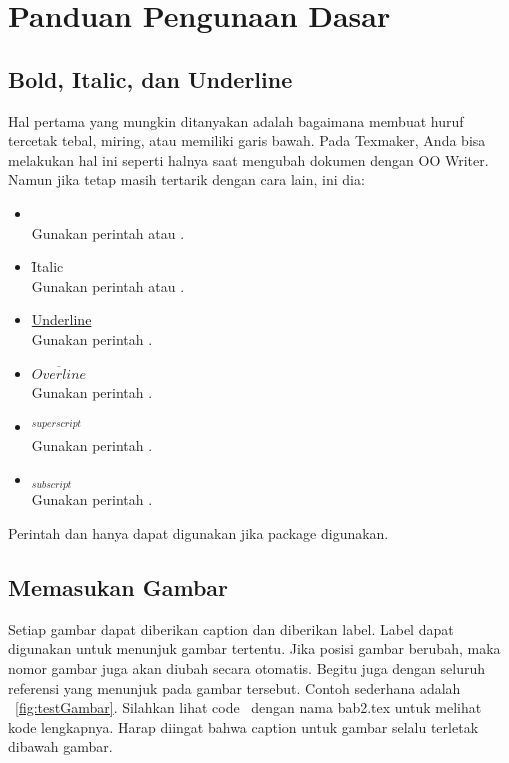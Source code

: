 \section{Panduan Pengunaan Dasar \latex}
\label{sec:latexUsage}

\subsection{Bold, Italic, dan Underline}
\label{sec:latexBIU}
Hal pertama yang mungkin ditanyakan adalah bagaimana membuat huruf tercetak tebal, miring, atau memiliki garis bawah.
Pada Texmaker, Anda bisa melakukan hal ini seperti halnya saat mengubah dokumen dengan OO Writer.
Namun jika tetap masih tertarik dengan cara lain, ini dia:

\begin{itemize}
	\item {} \\
	      Gunakan perintah  atau
	      .
	\item \f{Italic} \\
	      Gunakan perintah  atau
	      .
	\item \underline{Underline} \\
	      Gunakan perintah .
	\item $\overline{Overline}$ \\
	      Gunakan perintah .
	\item $^{superscript}$ \\
	      Gunakan perintah \code{\bslash{}$\lbrace\rbrace$}.
	\item $_{subscript}$ \\
	      Gunakan perintah \code{\bslash{}\_$\lbrace\rbrace$}.
\end{itemize}

Perintah  dan  hanya dapat digunakan jika package  digunakan.


\subsection{Memasukan Gambar}
\label{sec:latexImage}
Setiap gambar dapat diberikan caption dan diberikan label. Label dapat digunakan untuk menunjuk gambar tertentu.
Jika posisi gambar berubah, maka nomor gambar juga akan diubah secara
otomatis.
Begitu juga dengan seluruh referensi yang menunjuk pada gambar tersebut.
Contoh sederhana adalah \pic~\ref{fig:testGambar}.
Silahkan lihat code \latex~dengan nama bab2.tex untuk melihat kode lengkapnya.
Harap diingat bahwa caption untuk gambar selalu terletak dibawah gambar.

